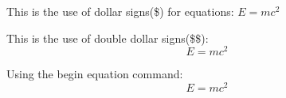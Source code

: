 \documentclass[a4paper, 12 pt]{article}
\begin{document}
	This is the use of dollar signs(\$) for equations:
	$E = mc^2$
	
	This is the use of double dollar signs(\$\$):
	$$E = mc^2$$
	
	Using the begin equation command:
	\begin{equation}
	E = mc^2
	\end{equation}
\end{document}
